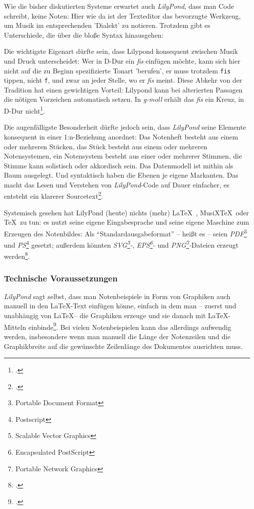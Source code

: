 Wie die bisher diskutierten Systeme erwartet auch \emph{LilyPond}, dass man Code
schreibt, keine Noten: Hier wie da ist der Texteditor das bevorzugte Werkzeug,
um Musik im entsprechenden 'Dialekt' zu notieren. Trotzdem gibt es Unterschiede,
die über die bloße Syntax hinausgehen:

Die wichtigste Eigenart dürfte sein, dass Lilypond konsequent zwischen Musik und
Druck unterscheidet: Wer in D-Dur ein \emph{fis} einfügen möchte, kann sich hier
nicht auf die zu Beginn spezifizierte Tonart 'berufen', er muss trotzdem
\texttt{fis} tippen, nicht \texttt{f}, und zwar an jeder Stelle, wo er
\emph{fis} meint. Diese Abkehr von der Tradition hat einen gewichtigen Vorteil:
Lilypond kann bei alterierten Passagen die nötigen Vorzeichen automatisch
setzen. In \emph{g-moll} erhält das \emph{fis} ein Kreuz, in D-Dur
nicht\footcite[vgl.][21]{LilyPond2018b}.

Die augenfälligste Besonderheit dürfte jedoch sein, dass \emph{LilyPond} seine
Elemente konsequent in einer 1:n-Beziehung anordnet: Das Notenheft besteht aus
einem oder mehreren Stücken, das Stück besteht aus einem oder mehreren
Notensystemen, ein Notensystem besteht aus einer oder mehrerer Stimmen, die
Stimme kann solistisch oder akkordisch sein. Das Datenmodell ist mithin als Baum
ausgelegt. Und syntaktisch haben die Ebenen je eigene Markanten. Das macht das
Lesen und Verstehen von \emph{LilyPond}-Code auf Dauer einfacher, es entsteht ein
klarerer Sourcetext\footcite[vgl.][40ff]{LilyPond2018b}.

Systemisch gesehen hat LilyPond (heute) nichts (mehr) \LaTeX\ , MusiX\TeX\ oder
\TeX\ zu tun: es nutzt seine eigene Eingabesprache und seine eigene Maschine zum
Erzeugen des Notenbildes: Als \enquote{Standardausgabeformat} -- heißt es --
seien \emph{PDF}\footnote{Portable Document Format} und
\emph{PS}\footnote{Postscript} gesetzt; außerdem könnten
\emph{SVG\footnote{Scalable Vector Graphics}-}, \emph{EPS\footnote{Encapsulated
PostScript}-} und \emph{PNG\footnote{Portable Network Graphics}-}Dateien erzeugt
werden\footcite[vgl.][481]{LilyPond2018c}.

\subsubsection{Technische Voraussetzungen}

\emph{LilyPond} sagt selbst, dass man Notenbeispiele in Form von Graphiken auch
manuell in den \LaTeX-Text einfügen könne, einfach in dem man -- zuerst und
unabhängig von \LaTeX -- die Graphiken erzeuge und sie danach mit \LaTeX-Mitteln
einbinde\footcite[vgl.][20]{LilyPond2018e}. Bei vielen Notenbeispielen kann das
allerdings aufwendig werden, insbesondere wenn man manuell die Länge der
Notenzeilen und die Graphikbreite auf die gewünschte Zeilenlänge des Dokumentes
ausrichten muss. 

